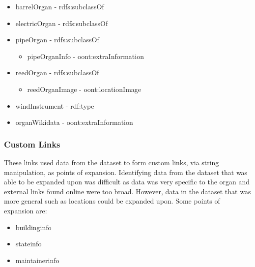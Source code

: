 \vspace{-0.15cm}
\begin{itemize}
    \itemsep0em 
    \item barrelOrgan - rdfs:subclassOf
    \item electricOrgan - rdfs:subclassOf
    \item pipeOrgan - rdfs:subclassOf
    \begin{itemize}
        \itemsep0em 
        \vspace{-0.15cm}
        \item pipeOrganInfo - oont:extraInformation
        \vspace{-0.15cm}
    \end{itemize}
    \item reedOrgan - rdfs:subclassOf
    \begin{itemize}
        \itemsep0em 
        \vspace{-0.15cm}
        \item reedOrganImage - oont:locationImage
        \vspace{-0.15cm}
    \end{itemize}
    \item windInstrument - rdf:type
    \item organWikidata - oont:extraInformation
\end{itemize}

\subsubsection{Custom Links}
\hspace*{0.5cm} These links used data from the dataset to form custom links, via string manipulation, as points of expansion. Identifying data from the dataset that was able to be expanded upon was difficult as data was very specific to the organ and external links found online were too broad. However, data in the dataset that was more general such as locations could be expanded upon. Some points of expansion are:

\vspace{-0.15cm}
\begin{itemize}
    \itemsep0em 
    \vspace{-0.05cm}
    \item buildinginfo
    \vspace{-0.05cm}
    \item stateinfo
    \vspace{-0.05cm}
    \item maintainerinfo
    \vspace{-0.05cm}
\end{itemize}
\vspace{-0.1cm}

